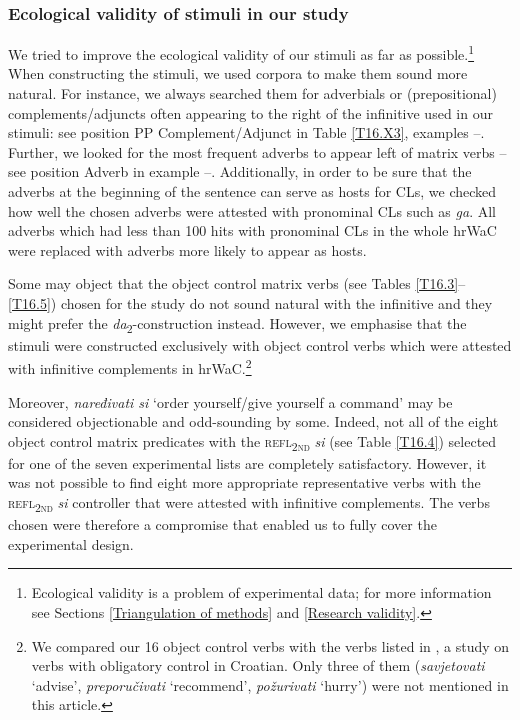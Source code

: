 \subsubsection{Ecological validity of stimuli in our study}
\label{Ecological validity of stimuli in our study}

We tried to improve the ecological validity of our stimuli as far as possible.\footnote{Ecological validity is a problem of experimental data; for more information see Sections \ref{Triangulation of methods} and \ref{Research validity}.} When constructing the stimuli, we used corpora to make them sound more natural. For instance, we always searched them for adverbials or (prepositional) complements/adjuncts often appearing to the right of the infinitive used in our stimuli: see position PP Complement/Adjunct in Table \ref{T16.X3}, examples --. Further, we looked for the most frequent adverbs to appear left of matrix verbs – see position Adverb in example --. Additionally, in order to be sure that the adverbs at the beginning of the sentence can serve as hosts for CLs, we checked how well the chosen adverbs were attested with pronominal CLs such as \textit{ga}. All adverbs which had less than 100 hits with pronominal CLs in the whole hrWaC were replaced with adverbs more likely to appear as hosts.

Some may object that the object control matrix verbs (see Tables \ref{T16.3}--\ref{T16.5}) chosen for the study do not sound natural with the infinitive and they might prefer the \textit{da}\textsubscript{2}-construction instead. However, we emphasise that the stimuli were constructed exclusively with object control verbs which were attested with infinitive complements in hrWaC.\footnote{We compared our 16 object control verbs with the verbs listed in \citet[][]{GnjatovicMatasovic13}, a study on verbs with obligatory control in Croatian. Only three of them (\textit{savjetovati} ‘advise’, \textit{preporučivati} ‘recommend’, \textit{požurivati} ‘hurry’) were not mentioned in this article.}

Moreover, \textit{naređivati si} ‘order yourself/give yourself a command’ may be considered objectionable and odd-sounding by some. Indeed, not all of the eight object control matrix predicates with the \textsc{refl\textsubscript{2nd}} \textit{si} (see Table \ref{T16.4}) selected for one of the seven experimental lists are completely satisfactory. However, it was not possible to find eight more appropriate representative verbs with the \textsc{refl\textsubscript{2nd}} \textit{si} controller that were attested with infinitive complements. The verbs chosen were therefore a compromise that enabled us to fully cover the experimental design. 

